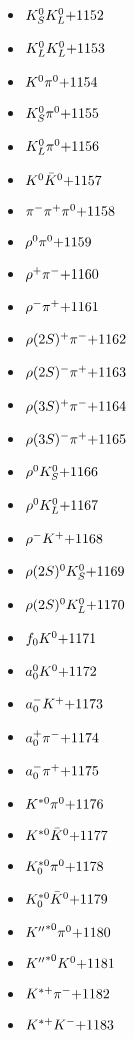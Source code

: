 \begin{multicols}{3}
\begin{itemize}
 \item $ K_{S}^{0} K_{L}^{0} \hfill{+1152}$
 \item $ K_{L}^{0} K_{L}^{0} \hfill{+1153}$
 \item $ K^{0} \pi^{0} \hfill{+1154}$
 \item $ K_{S}^{0} \pi^{0} \hfill{+1155}$
 \item $ K_{L}^{0} \pi^{0} \hfill{+1156}$
 \item $ K^{0} \bar{K}^{0} \hfill{+1157}$
 \item $ \pi^{-} \pi^{+} \pi^{0} \hfill{+1158}$
 \item $ \rho^{0} \pi^{0} \hfill{+1159}$
 \item $ \rho^{+} \pi^{-} \hfill{+1160}$
 \item $ \rho^{-} \pi^{+} \hfill{+1161}$
 \item $ \rho(2S)^{+} \pi^{-} \hfill{+1162}$
 \item $ \rho(2S)^{-} \pi^{+} \hfill{+1163}$
 \item $ \rho(3S)^{+} \pi^{-} \hfill{+1164}$
 \item $ \rho(3S)^{-} \pi^{+} \hfill{+1165}$
 \item $ \rho^{0} K_{S}^{0} \hfill{+1166}$
 \item $ \rho^{0} K_{L}^{0} \hfill{+1167}$
 \item $ \rho^{-} K^{+} \hfill{+1168}$
 \item $ \rho(2S)^{0} K_{S}^{0} \hfill{+1169}$
 \item $ \rho(2S)^{0} K_{L}^{0} \hfill{+1170}$
 \item $ f_{0} K^{0} \hfill{+1171}$
 \item $ a_{0}^{0} K^{0} \hfill{+1172}$
 \item $ a_{0}^{-} K^{+} \hfill{+1173}$
 \item $ a_{0}^{+} \pi^{-} \hfill{+1174}$
 \item $ a_{0}^{-} \pi^{+} \hfill{+1175}$
 \item $ K^{*0} \pi^{0} \hfill{+1176}$
 \item $ K^{*0} \bar{K}^{0} \hfill{+1177}$
 \item $ K_{0}^{*0} \pi^{0} \hfill{+1178}$
 \item $ K_{0}^{*0} \bar{K}^{0} \hfill{+1179}$
 \item $ {K^{\prime\prime}}^{*0} \pi^{0} \hfill{+1180}$
 \item $ {K^{\prime\prime}}^{*0} K^{0} \hfill{+1181}$
 \item $ K^{*+} \pi^{-} \hfill{+1182}$
 \item $ K^{*+} K^{-} \hfill{+1183}$

\end{itemize}
\end{multicols}
